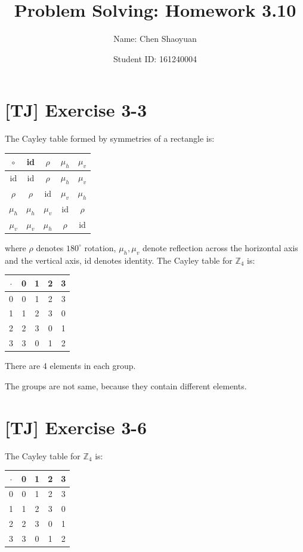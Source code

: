 \documentclass[a4paper,11pt,twocolumn]{article}
\newcommand{\homeworkno}{3.10}
\begin{document}
  \title{Problem Solving: Homework \homeworkno}
  \author{Name: Chen Shaoyuan \and Student ID: 161240004}
  \maketitle

  \section{[TJ] Exercise 3-3}
  The Cayley table formed by symmetries of a rectangle is: \par
  \begin{table}[h]
  \begin{tabular}{c|cccc}
    $\circ$ & id & $\rho$ & $\mu_h$ & $\mu_v$ \\ \hline
    id & id & $\rho$ & $\mu_h$ & $\mu_v$ \\
    $\rho$ & $\rho$ & id & $\mu_v$ & $\mu_h$ \\
    $\mu_h$ & $\mu_h$ & $\mu_v$ & id & $\rho$ \\
    $\mu_v$ & $\mu_v$ & $\mu_h$ & $\rho$ & id
  \end{tabular}
  \end{table}
  where $\rho$ denotes $180^\circ$ rotation, $\mu_h, \mu_v$ denote reflection across the horizontal axis and the vertical axis, id denotes identity.
  The Cayley table for $\mathbb{Z}_4$ is: \par
  \begin{table}[h]
  \begin{tabular}{c|cccc}
    $\cdot$ & 0 & 1 & 2 & 3 \\ \hline
    0 & 0 & 1 & 2 & 3 \\
    1 & 1 & 2 & 3 & 0 \\
    2 & 2 & 3 & 0 & 1 \\
    3 & 3 & 0 & 1 & 2
  \end{tabular}
  \end{table}
  There are 4 elements in each group. \par
  The groups are not same, because they contain different elements.

  \section{[TJ] Exercise 3-6}
  The Cayley table for $\mathbb{Z}_4$ is: \par
  \begin{table}[h]
  \begin{tabular}{c|cccc}
    $\cdot$ & 0 & 1 & 2 & 3 \\ \hline
    0 & 0 & 1 & 2 & 3 \\
    1 & 1 & 2 & 3 & 0 \\
    2 & 2 & 3 & 0 & 1 \\
    3 & 3 & 0 & 1 & 2
  \end{tabular}
  \end{table}
\end{document}
